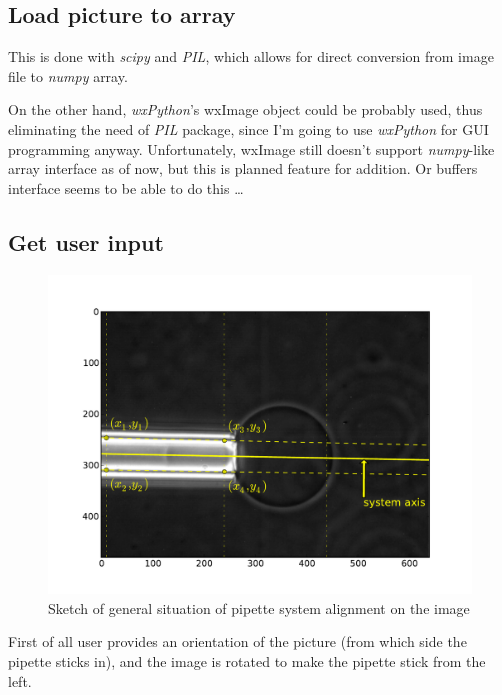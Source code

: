 \subsection{Load picture to array}\label{loadpic}

This is done with \emph{scipy} and \emph{PIL}, which allows for direct conversion from image file to \emph{numpy} array.

On the other hand, \emph{wxPython}'s wxImage object could be probably used, thus eliminating the need of \emph{PIL} package, since I'm going to use \emph{wxPython} for GUI programming anyway. Unfortunately, wxImage still doesn't support \emph{numpy}-like array interface as of now, but this is planned feature for addition. Or buffers interface seems to be able to do this \ldots

\subsection{Get user input}\label{getinput}

\begin{figure}%
\includegraphics[width=\columnwidth]{figs/pipetteaxis.pdf}%
\caption{Sketch of general situation of pipette system alignment on the image}%
\label{fig:pipetteaxis}%
\end{figure}

First of all user provides an orientation of the picture (from which side the pipette sticks in), and the image is rotated to make the pipette stick from the left.

